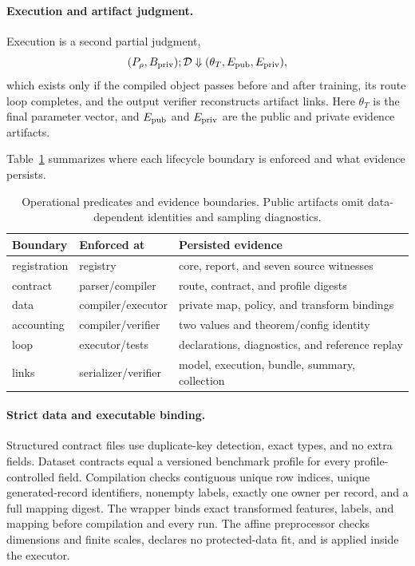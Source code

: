\documentclass[letterpaper]{article}
\begin{document}
\paragraph{Execution and artifact judgment.}
Execution is a second partial judgment,
\[
 (P_\rho,B_{\rm priv});\mathcal D \Downarrow
 (\theta_T,E_{\rm pub},E_{\rm priv}),
\]
which exists only if the compiled object passes before and after training, its
route loop completes, and the output verifier reconstructs artifact links.
Here $\theta_T$ is the final parameter vector, and $E_{\rm pub}$ and
$E_{\rm priv}$ are the public and private evidence artifacts.

Table~\ref{tab:judgment-evidence} summarizes where each lifecycle boundary is
enforced and what evidence persists.

\begin{table}[t]
\centering
\small
\setlength{\tabcolsep}{3pt}
\begin{tabular}{@{}p{}p{}p{}@{}}
\toprule
Boundary & Enforced at & Persisted evidence \\
\midrule
registration & registry & core, report, and seven source witnesses \\
contract & parser/compiler & route, contract, and profile digests \\
data & compiler/executor & private map, policy, and transform bindings \\
accounting & compiler/verifier & two values and theorem/config identity \\
loop & executor/tests & declarations, diagnostics, and reference replay \\
links & serializer/verifier & model, execution, bundle, summary, collection \\
\bottomrule
\end{tabular}
\caption{Operational predicates and evidence boundaries.  Public artifacts
omit data-dependent identities and sampling diagnostics.}
\label{tab:judgment-evidence}
\end{table}

\paragraph{Strict data and executable binding.}
Structured contract files use duplicate-key detection, exact types, and no
extra fields.
Dataset contracts equal a versioned benchmark profile for every
profile-controlled field.  Compilation checks contiguous unique row indices,
unique generated-record identifiers, nonempty labels, exactly one owner per
record, and a full mapping digest.  The wrapper binds exact transformed
features, labels, and mapping before compilation and every run.  The affine
preprocessor checks dimensions and finite scales, declares no protected-data
fit, and is applied inside the executor.
\end{document}
